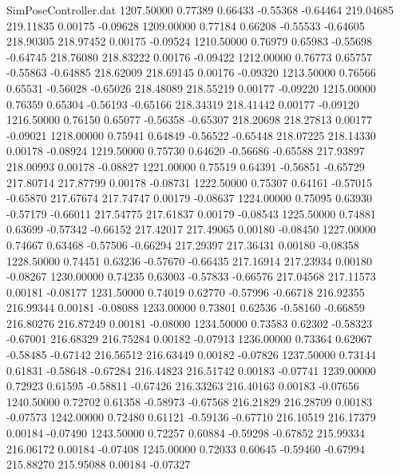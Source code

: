 \begin{filecontents}{SimPoseController.dat}
1207.50000    0.77389    0.66433    -0.55368   -0.64464  219.04685  219.11835    0.00175   -0.09628
1209.00000    0.77184    0.66208    -0.55533   -0.64605  218.90305  218.97452    0.00175   -0.09524
1210.50000    0.76979    0.65983    -0.55698   -0.64745  218.76080  218.83222    0.00176   -0.09422
1212.00000    0.76773    0.65757    -0.55863   -0.64885  218.62009  218.69145    0.00176   -0.09320
1213.50000    0.76566    0.65531    -0.56028   -0.65026  218.48089  218.55219    0.00177   -0.09220
1215.00000    0.76359    0.65304    -0.56193   -0.65166  218.34319  218.41442    0.00177   -0.09120
1216.50000    0.76150    0.65077    -0.56358   -0.65307  218.20698  218.27813    0.00177   -0.09021
1218.00000    0.75941    0.64849    -0.56522   -0.65448  218.07225  218.14330    0.00178   -0.08924
1219.50000    0.75730    0.64620    -0.56686   -0.65588  217.93897  218.00993    0.00178   -0.08827
1221.00000    0.75519    0.64391    -0.56851   -0.65729  217.80714  217.87799    0.00178   -0.08731
1222.50000    0.75307    0.64161    -0.57015   -0.65870  217.67674  217.74747    0.00179   -0.08637
1224.00000    0.75095    0.63930    -0.57179   -0.66011  217.54775  217.61837    0.00179   -0.08543
1225.50000    0.74881    0.63699    -0.57342   -0.66152  217.42017  217.49065    0.00180   -0.08450
1227.00000    0.74667    0.63468    -0.57506   -0.66294  217.29397  217.36431    0.00180   -0.08358
1228.50000    0.74451    0.63236    -0.57670   -0.66435  217.16914  217.23934    0.00180   -0.08267
1230.00000    0.74235    0.63003    -0.57833   -0.66576  217.04568  217.11573    0.00181   -0.08177
1231.50000    0.74019    0.62770    -0.57996   -0.66718  216.92355  216.99344    0.00181   -0.08088
1233.00000    0.73801    0.62536    -0.58160   -0.66859  216.80276  216.87249    0.00181   -0.08000
1234.50000    0.73583    0.62302    -0.58323   -0.67001  216.68329  216.75284    0.00182   -0.07913
1236.00000    0.73364    0.62067    -0.58485   -0.67142  216.56512  216.63449    0.00182   -0.07826
1237.50000    0.73144    0.61831    -0.58648   -0.67284  216.44823  216.51742    0.00183   -0.07741
1239.00000    0.72923    0.61595    -0.58811   -0.67426  216.33263  216.40163    0.00183   -0.07656
1240.50000    0.72702    0.61358    -0.58973   -0.67568  216.21829  216.28709    0.00183   -0.07573
1242.00000    0.72480    0.61121    -0.59136   -0.67710  216.10519  216.17379    0.00184   -0.07490
1243.50000    0.72257    0.60884    -0.59298   -0.67852  215.99334  216.06172    0.00184   -0.07408
1245.00000    0.72033    0.60645    -0.59460   -0.67994  215.88270  215.95088    0.00184   -0.07327

\end{filecontents}
